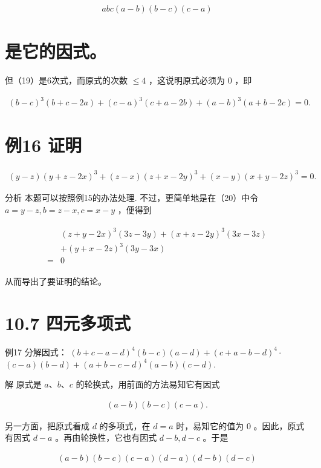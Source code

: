 \documentclass[10pt]{article}
\begin{document}
\begin{align*}
a b c(a-b)(b-c)(c-a) \tag{19}
\end{align*}

\section*{是它的因式。}
但（19）是6次式，而原式的次数 $\leqslant 4$ ，这说明原式必须为 0 ，即

\begin{align*}
(b-c)^{3}(b+c-2 a)+(c-a)^{3}(c+a-2 b)+(a-b)^{3}(a+b-2 c)=0 . \tag{20}
\end{align*}

\section*{例16 证明}
\begin{align*}
(y-z)(y+z-2 x)^{3}+(z-x)(z+x-2 y)^{3}+(x-y)(x+y-2 z)^{3}=0 .
\end{align*}

分析 本题可以按照例15的办法处理. 不过，更简单地是在（20）中令 $a=y-z, b=z-x, c=x-y$ ，便得到

\begin{align*}
\begin{aligned}
& (z+y-2 x)^{3}(3 z-3 y)+(x+z-2 y)^{3}(3 x-3 z) \\
& +(y+x-2 z)^{3}(3 y-3 x) \\
= & 0
\end{aligned}
\end{align*}

从而导出了要证明的结论。

\section*{10.7 四元多项式}
例17 分解因式： $(b+c-a-d)^{4}(b-c)(a-d)+(c+a-b-d)^{4} \cdot$ $(c-a)(b-d)+(a+b-c-d)^{4}(a-b)(c-d)$.

解 原式是 $a 、 b 、 c$ 的轮换式，用前面的方法易知它有因式

\begin{align*}
(a-b)(b-c)(c-a) .
\end{align*}

另一方面，把原式看成 $d$ 的多项式，在 $d=a$ 时，易知它的值为 0 。因此，原式有因式 $d-a$ 。再由轮换性，它也有因式 $d-b, d-c$ 。于是

\begin{align*}
(a-b)(b-c)(c-a)(d-a)(d-b)(d-c)
\end{align*}
\end{document}
